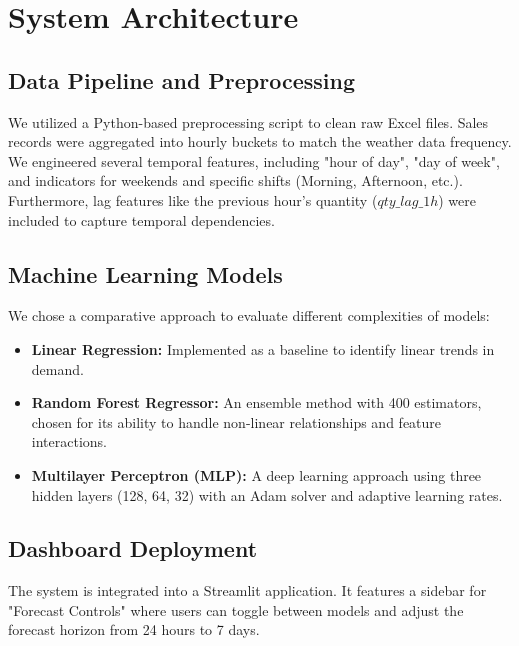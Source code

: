 \chapter{System Architecture}
\label{sec:system}

\section{Data Pipeline and Preprocessing}
We utilized a Python-based preprocessing script to clean raw Excel files. Sales records were aggregated into hourly buckets to match the weather data frequency. We engineered several temporal features, including "hour of day", "day of week", and indicators for weekends and specific shifts (Morning, Afternoon, etc.). Furthermore, lag features like the previous hour's quantity ($qty\_lag\_1h$) were included to capture temporal dependencies.

\section{Machine Learning Models}
We chose a comparative approach to evaluate different complexities of models:
\begin{itemize}
    \item \textbf{Linear Regression:} Implemented as a baseline to identify linear trends in demand.
    \item \textbf{Random Forest Regressor:} An ensemble method with 400 estimators, chosen for its ability to handle non-linear relationships and feature interactions.
    \item \textbf{Multilayer Perceptron (MLP):} A deep learning approach using three hidden layers (128, 64, 32) with an Adam solver and adaptive learning rates.
\end{itemize}

\section{Dashboard Deployment}
The system is integrated into a Streamlit application. It features a sidebar for "Forecast Controls" where users can toggle between models and adjust the forecast horizon from 24 hours to 7 days.